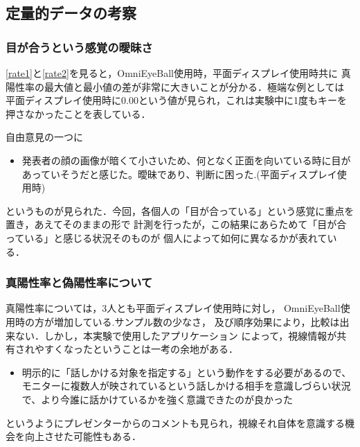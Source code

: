 \begin{comment}
・全天周カメラ自体の視野の広さと，撮影領域上下が広がるような歪みによって，相対的に顔が小さくなることが原因であると考えられる．

・よって，全天周カメラを用いて顔を映したコミュニケーションを行う際には，何らかの方法で顔部分をクローズアップする必要がある．

・「ディスプレイのサイズ的に３人とも常に視野の中に収まってはいるので、クリックした人が真ん中に来る必要はないかな…と感じた。
画像そのものが移動するよりは、クリックしている間はカーソルの周辺に枠がでる…とかのほうが「ひとりにフォーカスしている感」があって良いかもしれないと思いました。」(OEB使用時，プレゼンター側)

・PCを使用するプレゼンター側において，常にカメラの方を向くことで見たい人間を正面に捉えるように設計したが，常に3人とも視界に入っているためかえって混乱を招くことになった．
\end{comment}

\subsection*{定量的データの考察}

\subsubsection*{目が合うという感覚の曖昧さ}

\ref{rate1}と\ref{rate2}を見ると，OmniEyeBall使用時，平面ディスプレイ使用時共に
真陽性率の最大値と最小値の差が非常に大きいことが分かる．極端な例としては
平面ディスプレイ使用時に$0.00$という値が見られ，これは実験中に1度もキーを
押さなかったことを表している．

自由意見の一つに
\begin{itemize}
  \item 発表者の顔の画像が暗くて小さいため、何となく正面を向いている時に目があっていそうだと感じた。曖昧であり、判断に困った.(平面ディスプレイ使用時)
\end{itemize}
というものが見られた．今回，各個人の「目が合っている」という感覚に重点を置き，あえてそのままの形で
計測を行ったが，この結果にあらためて「目が合っている」と感じる状況そのものが
個人によって如何に異なるかが表れている．

\subsubsection*{真陽性率と偽陽性率について}

真陽性率については，3人とも平面ディスプレイ使用時に対し，
OmniEyeBall使用時の方が増加している.サンプル数の少なさ，
及び順序効果により，比較は出来ない．しかし，本実験で使用したアプリケーション
によって，視線情報が共有されやすくなったということは一考の余地がある．
\begin{itemize}
  \item 明示的に「話しかける対象を指定する」という動作をする必要があるので、モニターに複数人が映されているという話しかける相手を意識しづらい状況で、より今誰に話かけているかを強く意識できたのが良かった
\end{itemize}
というようにプレゼンターからのコメントも見られ，視線それ自体を意識する機会を向上させた可能性もある．

